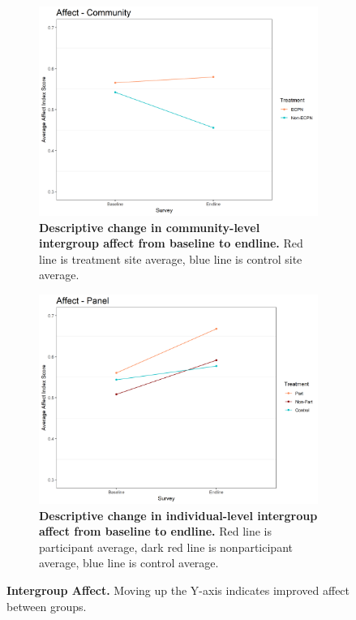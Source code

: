 \documentclass[11pt]{article}
\begin{document}
\begin{figure}[H]
    \begin{subfigure}[b]{.48\textwidth}
    \centering
        \includegraphics[width=\linewidth]{../../../figs/affectComm_plot.png}
        \caption{\textbf{Descriptive change in community-level intergroup affect from baseline to endline.} Red line is treatment site average, blue line is control site average.}
        \label{fig:fig3}
    \end{subfigure}
    \hfill
    \begin{subfigure}[b]{.48\textwidth}
    \centering
        \includegraphics[width=\linewidth]{../../../figs/affectPan_plot.png}
        \caption{\textbf{Descriptive change in individual-level intergroup affect from baseline to endline.} Red line is participant average, dark red line is nonparticipant average, blue line is control average.}
        \label{fig:fig4}
    \end{subfigure}
\caption{\textbf{Intergroup Affect.} Moving up the Y-axis indicates improved affect between groups.}
\end{figure}
\end{document}
